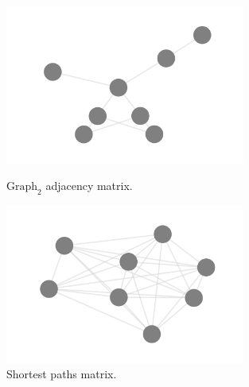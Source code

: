 \documentclass[11pt,a4paper]{article}
\begin{document}
\begin{figure}[H]
	\begin{minipage}[t]{0.5\linewidth}
		\centering
		\includegraphics[width=0.7\textwidth]{img/acidovorax_graph_6am.png}
		\caption{$\text{Graph}_2$ adjacency matrix.}
		\label{f1}
	\end{minipage}
	\hspace{0.1cm}
	\begin{minipage}[t]{0.5\linewidth} 
		\centering
		\includegraphics[width=0.7\textwidth]{img/acidovorax_graph_6sp.png}
		\caption{Shortest paths matrix.}
		\label{g2_w}
	\end{minipage}        
\end{figure}
\end{document}
